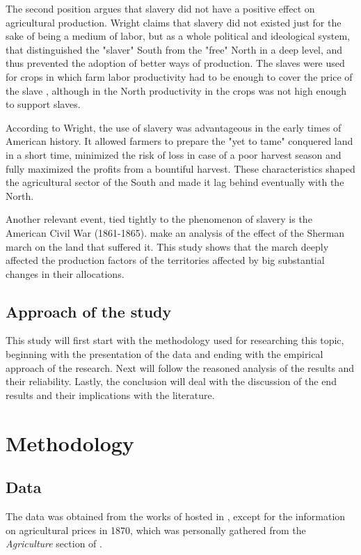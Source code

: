 \documentclass[12pt]{report}
\begin{document}
The second position argues that slavery did not have a positive effect on agricultural production. Wright claims that slavery did not existed just for the sake of being a medium of labor, but as a whole political and ideological system, that distinguished the "slaver" South from the "free" North in a deep level, and thus prevented the adoption of better ways of production. The slaves were used for crops in which farm labor productivity had to be enough to cover the price of the slave \citep[29--30]{wright2013slavery}, although in the North productivity in the crops was not high enough to support slaves.

According to Wright, the use of slavery was advantageous in the early times of American history. It allowed farmers to prepare the "yet to tame" conquered land in a short time, minimized the risk of loss in case of a poor harvest season and fully maximized the profits from a bountiful harvest. These characteristics shaped the agricultural sector of the South and made it lag behind eventually with the North.

Another relevant event, tied tightly to the phenomenon of slavery is the American Civil War (1861-1865). \cite{feigenbaum2018capital} make an analysis of the effect of the Sherman march on the land that suffered it. This study shows that the march deeply affected the production factors of the territories affected by big substantial changes in their allocations.
\section{Approach of the study}
This study will first start with the methodology used for researching this topic, beginning with the presentation of the data and ending with the empirical approach of the research. Next will follow the reasoned analysis of the results and their reliability. Lastly, the conclusion will deal with the discussion of the end results and their implications with the literature.

\chapter{Methodology}
\section{Data}
The data was obtained from the works of \citet{haines10} hosted in \citet{nhgis}, except for the information on agricultural prices in 1870, which was personally gathered from the \emph{Agriculture} section of \citet{histstat}.
\end{document}
